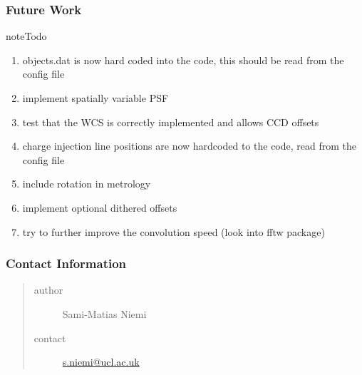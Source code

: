 \documentclass[a4paper,11pt,english]{sphinxmanual}
\begin{document}
\subsubsection{Future Work}
\label{simulator:future-work}
\begin{notice}{note}{Todo}
\begin{enumerate}
\item {} 
objects.dat is now hard coded into the code, this should be read from the config file

\item {} 
implement spatially variable PSF

\item {} 
test that the WCS is correctly implemented and allows CCD offsets

\item {} 
charge injection line positions are now hardcoded to the code, read from the config file

\item {} 
include rotation in metrology

\item {} 
implement optional dithered offsets

\item {} 
try to further improve the convolution speed (look into fftw package)

\end{enumerate}
\end{notice}


\subsubsection{Contact Information}
\label{simulator:contact-information}\begin{quote}\begin{description}
\item[{author}] \leavevmode
Sami-Matias Niemi

\item[{contact}] \leavevmode
\href{mailto:s.niemi@ucl.ac.uk}{s.niemi@ucl.ac.uk}

\end{description}\end{quote}
\end{document}

